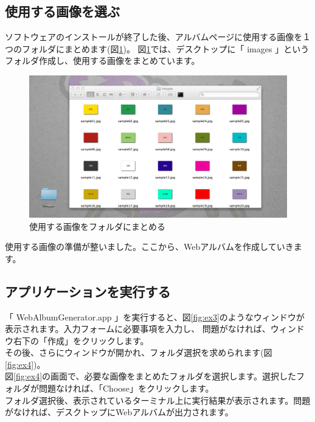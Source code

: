 \documentclass[]{jsarticle}
\begin{document}
\subsection{使用する画像を選ぶ}

ソフトウェアのインストールが終了した後、アルバムページに使用する画像を１つのフォルダにまとめます(図\ref{fig:ex2})。
図\ref{fig:ex2}では、デスクトップに「 images 」というフォルダ作成し、使用する画像をまとめています。

\begin{figure}[htbp] %
 \begin{center}
  \includegraphics[width=120mm]{images/ex2.eps}
 \end{center}
 \caption{使用する画像をフォルダにまとめる}
 \label{fig:ex2}
\end{figure}

使用する画像の準備が整いました。ここから、Webアルバムを作成していきます。\\

\subsection{アプリケーションを実行する}

「 WebAlbumGenerator.app 」を実行すると、図\ref{fig:ex3}のようなウィンドウが表示されます。入力フォームに必要事項を入力し、
問題がなければ、ウィンドウ右下の「作成」をクリックします。\\

その後、さらにウィンドウが開かれ、フォルダ選択を求められます(図\ref{fig:ex4})。\\
図\ref{fig:ex4}の画面で、必要な画像をまとめたフォルダを選択します。選択したフォルダが問題なければ、「Choose」をクリックします。\\

フォルダ選択後、表示されているターミナル上に実行結果が表示されます。問題がなければ、デスクトップにWebアルバムが出力されます。
\end{document}
